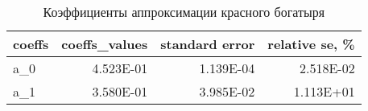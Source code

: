 \begin{table}[H]
\centering
\caption{Коэффициенты аппроксимации красного богатыря}
\label{coeffs_table}
\begin{tabular}{lrrr}
\toprule
coeffs &  coeffs\_values &  standard error &  relative se, \% \\
\midrule
   a\_0 &      4.523E-01 &       1.139E-04 &       2.518E-02 \\
   a\_1 &      3.580E-01 &       3.985E-02 &       1.113E+01 \\
\bottomrule
\end{tabular}
\end{table}
